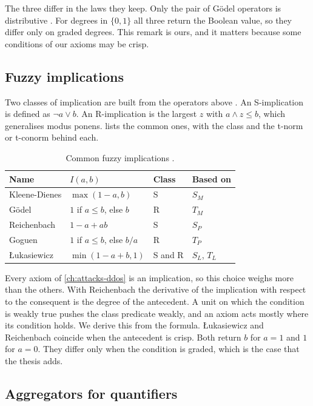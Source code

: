 The three differ in the laws they keep. Only the pair of G\"odel operators is
distributive \citep{badreddine2022ltn}. For degrees in $\{0,1\}$ all three
return the Boolean value, so they differ only on graded degrees. This remark
is ours, and it matters because some conditions of our axioms may be crisp.

\subsection{Fuzzy implications}
\label{sec:fuzzy-implications}

Two classes of implication are built from the operators above
\citep{badreddine2022ltn}. An S-implication is defined as $\neg a\vee b$. An
R-implication is the largest $z$ with $a\wedge z\leq b$, which generalises
modus ponens.  lists the common ones, with the class and
the t-norm or t-conorm behind each.

\begin{table}[htbp]
\centering
\footnotesize
\caption{Common fuzzy implications \citep{badreddine2022ltn}.}
\label{tab:implications}
\begin{tabular}{@{}llll@{}}
\toprule
Name & $I(a,b)$ & Class & Based on \\
\midrule
Kleene-Dienes & $\max(1-a,b)$ & S & $S_M$ \\
G\"odel & $1$ if $a\leq b$, else $b$ & R & $T_M$ \\
Reichenbach & $1-a+ab$ & S & $S_P$ \\
Goguen & $1$ if $a\leq b$, else $b/a$ & R & $T_P$ \\
{\L}ukasiewicz & $\min(1-a+b,1)$ & S and R & $S_L$, $T_L$ \\
\bottomrule
\end{tabular}
\end{table}

Every axiom of \cref{ch:attacks-ddos} is an implication, so this choice weighs
more than the others. With Reichenbach the derivative of the implication with
respect to the consequent is the degree of the antecedent. A unit on which
the condition is weakly true pushes the class predicate weakly, and an axiom
acts mostly where its condition holds. We derive this from the formula. {\L}ukasiewicz and Reichenbach coincide when the
antecedent is crisp. Both return $b$ for $a=1$ and $1$ for $a=0$. They differ
only when the condition is graded, which is the case that the thesis adds.

\subsection{Aggregators for quantifiers}
\label{sec:aggregators}

